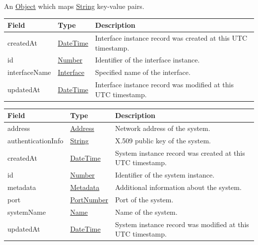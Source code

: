 \documentclass[a4paper]{arrowhead}
\newcommand{\pref}[1]{{\textcolor{ArrowheadGrey}{\hyperref[sec:model:primitives:#1]{#1}}}}
\begin{document}
\label{sec:model:Metadata}

An \pref{Object} which maps \pref{String} key-value pairs.

\clearpage

\label{sec:model:ServiceInterfaceRecord}

\begin{table}[ht!]
\begin{tabularx}{\textwidth}{| p{4.25cm} | p{3.5cm} | X |} \hline
\rowcolor{gray!33} Field & Type & Description \\ \hline
createdAt & \pref{DateTime} & Interface instance record was created at this UTC time\-stamp. \\ \hline
id & \pref{Number} & Identifier of the interface instance. \\ \hline
interfaceName &\pref{Interface} & Specified name of the interface. \\ \hline
updatedAt & \pref{DateTime} & Interface instance record was modified at this UTC time\-stamp. \\ \hline
\end{tabularx}
\end{table}

\label{sec:model:SystemRecord}

\begin{table}[ht!]
\begin{tabularx}{\textwidth}{| p{4.25cm} | p{3.5cm} | X |} \hline
\rowcolor{gray!33} Field & Type & Description \\ \hline

address &\pref{Address} & Network address of the system. \\ \hline
authenticationInfo &\pref{String} & X.509 public key of the system. \\ \hline
createdAt & \pref{DateTime} & System instance record was created at this UTC time\-stamp. \\ \hline
id & \pref{Number} & Identifier of the system instance. \\ \hline
metadata &\hyperref[sec:model:Metadata]{Metadata} & Additional information about the system. \\ \hline
port &\pref{PortNumber} & Port of the system. \\ \hline
systemName &\pref{Name} & Name of the system. \\ \hline
updatedAt & \pref{DateTime} & System instance record was modified at this UTC time\-stamp. \\ \hline
\end{tabularx}
\end{table}
\end{document}
